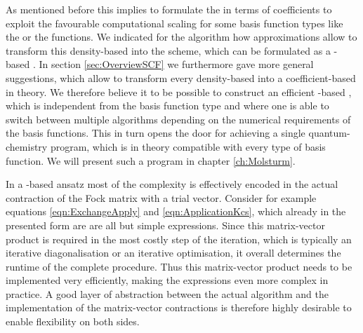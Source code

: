As mentioned before this implies to formulate the \SCF in terms of coefficients
to exploit the favourable computational scaling
for some basis function types like the \FE or the \CS functions.
We indicated for the \ODA algorithm
how approximations allow to transform this density-based
\SCF into the \tODA scheme,
which can be formulated as a \contraction-based \SCF.
In section \vref{sec:OverviewSCF} we furthermore gave more general suggestions,
which allow to transform every density-based \SCF
into a coefficient-based \SCF in theory.
We therefore believe it to be possible
to construct an efficient \contraction-based \SCF,
which is independent from the basis function type
and where one is able to switch between
multiple algorithms depending on the numerical requirements of the basis functions.
This in turn opens the door
for achieving a single quantum-chemistry program,
which is in theory compatible with every type of basis function.
We will present such a program in chapter \vref{ch:Molsturm}.

In a \contraction-based ansatz most of the complexity is effectively
encoded in the actual contraction of the Fock matrix with a trial vector.
Consider for example equations \eqref{eqn:ExchangeApply}
and \eqref{eqn:ApplicationKcs},
which already in the presented form are are all but simple expressions.
Since this matrix-vector product is required in the most costly step
of the \SCF iteration,
which is typically an iterative diagonalisation or an iterative optimisation,
it overall determines the runtime of the complete procedure.
Thus this matrix-vector product needs to be implemented very efficiently,
making the expressions even more complex in practice.
A good layer of abstraction between the actual \SCF algorithm
and the implementation of the matrix-vector contractions
is therefore highly desirable to enable flexibility on both sides.
